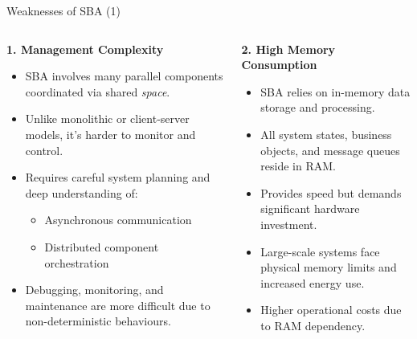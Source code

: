 \documentclass[aspectratio=169, table]{beamer}
\begin{document}
	\begin{frame}{Weaknesses of SBA (1)}
		\vspace{20pt}
		\begin{columns}[t]
			\begin{column}{0.52\textwidth}
				\textbf{1. Management Complexity}
				\begin{itemize}
					\item SBA involves many parallel components coordinated via shared \textit{space}.
					\item Unlike monolithic or client-server models, it's harder to monitor and control.
					\item Requires careful system planning and deep understanding of:
					\begin{itemize}
						\item Asynchronous communication
						\item Distributed component orchestration
					\end{itemize}
					\item Debugging, monitoring, and maintenance are more difficult due to non-deterministic behaviours.
				\end{itemize}
			\end{column}
			
			\begin{column}{0.48\textwidth}
				\textbf{2. High Memory Consumption}
				\begin{itemize}
					\item SBA relies on in-memory data storage and processing.
					\item All system states, business objects, and message queues reside in RAM.
					\item Provides speed but demands significant hardware investment.
					\item Large-scale systems face physical memory limits and increased energy use.
					\item Higher operational costs due to RAM dependency.
				\end{itemize}
			\end{column}
		\end{columns}
	\end{frame}
	
\end{document}
